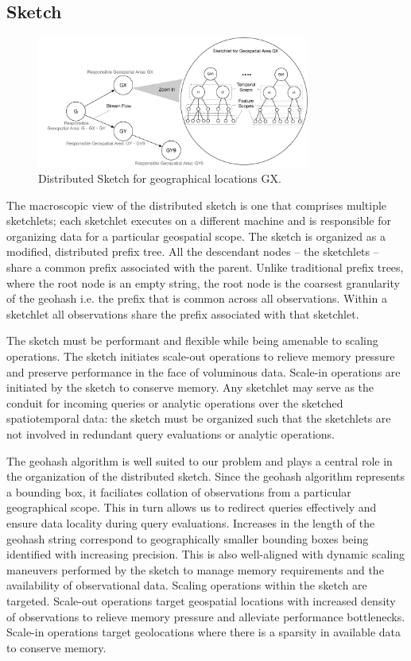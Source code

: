 \subsection{Sketch}
\begin{figure}
    \centerline{\includegraphics[width=0.8\textwidth]{figures/dist-sketch.pdf}}
    \caption{Distributed Sketch for geographical locations GX.}
    \label{fig:sketch}
\end{figure}

The macroscopic view of the distributed sketch is one that comprises multiple sketchlets; each sketchlet executes on a different machine and is responsible for organizing data for a particular geospatial scope. The sketch is organized as a modified, distributed prefix tree. All the descendant nodes – the sketchlets – share a common prefix associated with the parent. Unlike traditional prefix trees, where the root node is an empty string, the root node is the coarsest granularity of the geohash i.e. the prefix that is common across all observations. Within a sketchlet all observations share the prefix associated with that sketchlet.

The sketch must be performant and flexible while being amenable to scaling operations. The sketch initiates scale-out operations to relieve memory pressure and preserve performance in the face of voluminous data. Scale-in operations are initiated by the sketch to conserve memory. Any sketchlet may serve as the conduit for incoming queries or analytic operations over the sketched spatiotemporal data: the sketch must be organized such that the sketchlets are not involved in redundant query evaluations or analytic operations. 

The geohash algorithm is well suited to our problem and plays a central role in the organization of the distributed sketch. Since the geohash algorithm represents a bounding box, it faciliates collation of observations from a particular geographical scope. This in turn allows us to redirect queries effectively and ensure data locality during query evaluations. Increases in the length of the geohash string correspond to geographically smaller bounding boxes being identified with increasing precision. This is also well-aligned with dynamic scaling maneuvers performed by the sketch to manage memory requirements and the availability of observational data. Scaling operations within the sketch are targeted. Scale-out operations target geospatial locations with increased density of observations to relieve memory pressure and alleviate performance bottlenecks. Scale-in operations target geolocations where there is a sparsity in available data to conserve memory.

